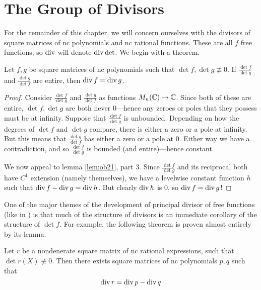 \section{The Group of Divisors}%
\label{sec:divpoly}

For the remainder of this chapter, we will concern ourselves with the divisors
of square matrices of nc polynomials and nc rational functions. These are all
\(f\) free functions, so \(\operatorname{div}\) will denote \(\operatorname{div} \det\). We begin with a
theorem.

\begin{theorem}
  Let \(f,g\) be square matrices of nc polynomials such that
  \(\det f, \det g \not\equiv 0\). If \(\frac{\det f}{\det g}\) and
  \(\frac{\det g}{\det f}\) are entire, then \(\operatorname{div} f = \operatorname{div} g\).
\end{theorem}

\begin{proof}
  Consider \(\frac{\det f}{\det g}\) and \(\frac{\det g}{\det f}\) as functions
  \(M_n(\mathbb{C})\to \mathbb{C} \). Since both of these are entire, \(\det f, \det g\) are
  both never 0---hence any zeroes or poles that they possess must be at
  infinity. Suppose that \(\frac{\det f}{\det g}\) is unbounded. Depending on how
  the degrees of \(\det f\) and \(\det g\) compare, there is either a zero or a
  pole at infinity. But this means that \(\frac{\det g}{\det f}\) has either a
  zero or a pole at \(0\). Either way we have a contradiction, and so
  \(\frac{\det f}{\det g}\) is bounded (and entire)---hence constant.

  We now appeal to lemma \ref{lem:ob21}, part 3. Since \(\frac{\det f}{\det g}\)
  and its reciprocal both have \(C^1\) extension (namely themselves), we have a
  levelwise constant function \(h\) such that \(\operatorname{div} f - \operatorname{div} g = \operatorname{div} h\).
  But clearly \(\operatorname{div} h\) is 0, so \(\operatorname{div} f = \operatorname{div} g\)!
\end{proof}

One of the major themes of the development of principal divisor of free
functions (like in \cite{pascoeFreeNoncommutativePrincipal2020}) is that much of
the structure of divisors is an immediate corollary of the structure of
\(\det f\). For example, the following theorem is proven almost entirely by its
lemma.

\begin{theorem}%
\label{thm:divop}
  Let \(r\) be a nondenerate square matrix of nc rational expressions, such that
  \(\det r(X) \not\equiv 0 \). Then there exists square matrices of nc
  polynomials \(p,q\)
  such that
  \[
    \operatorname{div} r = \operatorname{div} p - \operatorname{div} q
  \]
\end{theorem}

